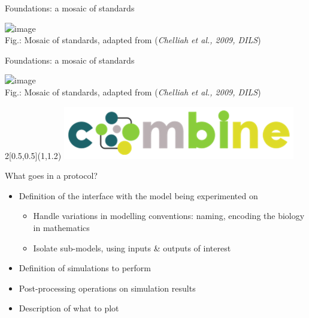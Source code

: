 \documentclass[t,xcolor={usenames,dvipsnames}]{beamer}
\begin{document}
\begin{frame}{Foundations: a mosaic of standards}
\begin{center}
\includegraphics<1->[scale=.5]{standards_mosaic}\\
{\tiny Fig.: Mosaic of standards, adapted from (\textit{Chelliah et al., 2009, DILS})}
\end{center}
\end{frame}

\begin{frame}{Foundations: a mosaic of standards}
\begin{center}
\includegraphics<1->[scale=.5]{standards_mosaic}\\
{\tiny Fig.: Mosaic of standards, adapted from (\textit{Chelliah et al., 2009, DILS})}
\end{center}
\begin{textblock}{2}[0.5,0.5](1,1.2)
\centering
\includegraphics[scale=.8]{COMBINE}
\end{textblock}
\end{frame}


\begin{frame}{What goes in a protocol?}
\begin{itemize}
\item Definition of the interface with the model being experimented on
  \begin{itemize}
  \item Handle variations in modelling conventions: naming, encoding the biology in mathematics
  \item Isolate sub-models, using inputs \& outputs of interest
  \end{itemize}
\item Definition of simulations to perform
\item Post-processing operations on simulation results
\item Description of what to plot
\end{itemize}
\end{frame}
\end{document}
